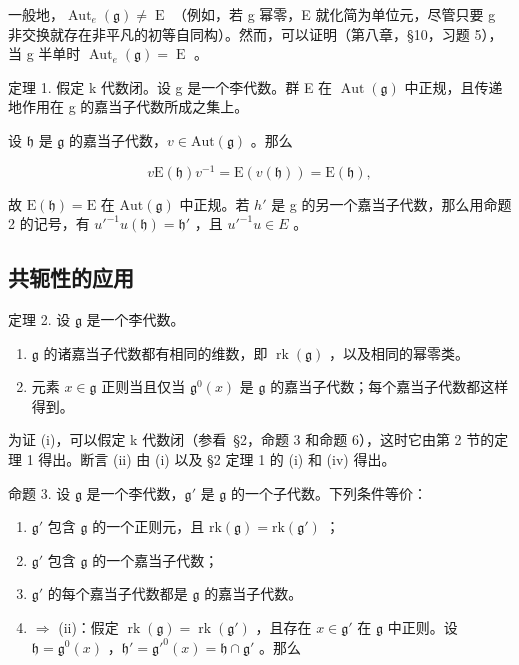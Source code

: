 一般地，\(\operatorname{Aut}_{e}(\mathfrak{g}) \neq \operatorname{E}\) （例如，若 g 幂零，E 就化简为单位元，尽管只要 g 非交换就存在非平凡的初等自同构）。然而，可以证明（第八章，§10，习题 5），当 g 半单时 \(\operatorname{Aut}_{e}(\mathfrak{g}) = \operatorname{E}\) 。

定理 1. 假定 k 代数闭。设 g 是一个李代数。群 E 在 \(\operatorname{Aut}(\mathfrak{g})\) 中正规，且传递地作用在 g 的嘉当子代数所成之集上。

设 \(\mathfrak{h}\) 是 \(\mathfrak{g}\) 的嘉当子代数，\(v\in\mathrm{Aut}(\mathfrak{g})\) 。那么

\[
v \mathrm{E} (\mathfrak {h}) v ^ {- 1} = \mathrm{E} (v (\mathfrak {h})) = \mathrm{E} (\mathfrak {h}),
\]

故 \(\mathrm{E}(\mathfrak{h}) = \mathrm{E}\) 在 \(\mathrm{Aut}(\mathfrak{g})\) 中正规。若 \(h'\) 是 g 的另一个嘉当子代数，那么用命题 2 的记号，有 \(u'^{-1}u(\mathfrak{h}) = \mathfrak{h}'\) ，且 \(u'^{-1}u \in E\) 。

\subsection{共轭性的应用}

定理 2. 设 \(\mathfrak{g}\) 是一个李代数。

\begin{enumerate}
\def\labelenumi{(\roman{enumi})}
\item
  \(\mathfrak{g}\) 的诸嘉当子代数都有相同的维数，即 \(\operatorname{rk}(\mathfrak{g})\) ，以及相同的幂零类。
\item
  元素 \(x \in \mathfrak{g}\) 正则当且仅当 \(\mathfrak{g}^0(x)\) 是 \(\mathfrak{g}\) 的嘉当子代数；每个嘉当子代数都这样得到。
\end{enumerate}

为证 (i)，可以假定 k 代数闭（参看~§2，命题 3 和命题 6），这时它由第 2 节的定理 1 得出。断言 (ii) 由 (i) 以及 §2 定理 1 的 (i) 和 (iv) 得出。

命题 3. 设 \(\mathfrak{g}\) 是一个李代数，\(\mathfrak{g}'\) 是 \(\mathfrak{g}\) 的一个子代数。下列条件等价：

\begin{enumerate}
\def\labelenumi{(\roman{enumi})}
\item
  \(\mathfrak{g}'\) 包含 \(\mathfrak{g}\) 的一个正则元，且 \(\mathrm{rk}(\mathfrak{g}) = \mathrm{rk}(\mathfrak{g}')\) ；
\item
  \(\mathfrak{g}'\) 包含 \(\mathfrak{g}\) 的一个嘉当子代数；
\item
  \(\mathfrak{g}'\) 的每个嘉当子代数都是 \(\mathfrak{g}\) 的嘉当子代数。
\item
  \(\Longrightarrow\) (ii)：假定 \(\operatorname{rk}(\mathfrak{g}) = \operatorname{rk}(\mathfrak{g}')\) ，且存在 \(x \in \mathfrak{g}'\) 在 \(\mathfrak{g}\) 中正则。设 \(\mathfrak{h} = \mathfrak{g}^0(x)\) ，\(\mathfrak{h}' = \mathfrak{g}'^0(x) = \mathfrak{h} \cap \mathfrak{g}'\) 。那么
\end{enumerate}

